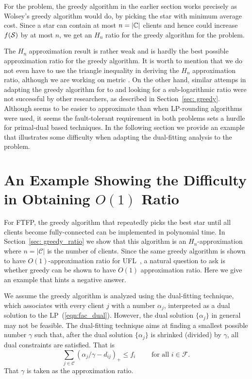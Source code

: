 \documentclass[oneside,final]{ucr}
\begin{document}
For the {\FTFP} problem, the greedy algorithm in the earlier
section works precisely as Wolsey's greedy algorithm would
do, by picking the star with minimum average cost. Since a
star can contain at most $n=|\mathbb{C}|$ clients and hence
could increase $f(\calS)$ by at most $n$, we get an $H_n$
ratio for the greedy algorithm for the {\FTFP} problem.

The $H_n$ approximation result is rather weak and is hardly
the best possible approximation ratio for the greedy
algorithm. It is worth to mention that we do not even have
to use the triangle inequality in deriving the $H_n$
approximation ratio, although we are working on metric
{\FTFP}. On the other hand, similar attemps in adapting the
greedy algorithm for {\UFL} to {\FTFL} and looking for a
sub-logarithmic ratio were not successful by other
researchers, as described in Section~\ref{sec:
  greedy}. Although {\FTFP} seems to be easier to
approximate than {\FTFL} when LP-rounding algorithms were
used, it seems the fault-tolerant requirement in both
problems sets a hurdle for primal-dual based techniques. In
the following section we provide an example that illustrates
some difficulty when adapting the dual-fitting analysis to
the {\FTFP} problem.

\section{An Example Showing the Difficulty in Obtaining
  $O(1)$ Ratio}
\label{sec: greedy_example}
For FTFP, the greedy algorithm that repeatedly picks the
best star until all clients become fully-connected can be
implemented in polynomial time. In Section~\ref{sec:
  greedy_ratio} we show that this algorithm is an
$H_n$-approximation where $n=|\mathcal C|$ is the number of
clients. Since the same greedy algorithm is shown to have
$O(1)$-approximation ratio for UFL~\cite{MahdianMSV01}, a
natural question to ask is whether greedy can be shown to
have $O(1)$ approximation ratio. Here we give an example
that hints a negative answer.

We assume the greedy algorithm is analyzed using the
dual-fitting technique, which associates with every client
$j$ with a number $\alpha_j$, interpreted as a dual solution
to the LP~(\ref{eqn:fac_dual}). However, the dual solution
$\{\alpha_j\}$ in general may not be feasible. The
dual-fitting technique aims at finding a smallest possible
number $\gamma$ such that, after the dual solution
$\{\alpha_j\}$ is shrinked (divided) by $\gamma$, all dual
constraints are satisfied. That is
\begin{equation*}
\sum_{j\in \mathcal C} (\alpha_j/\gamma
- d_{ij})_+ \leq f_i \qquad \text{ for all } i\in \mathcal F. 
\end{equation*}
That $\gamma$ is taken as the approximation ratio.
\end{document}
